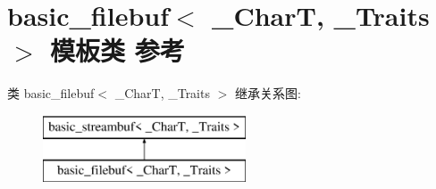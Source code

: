 \hypertarget{classbasic__filebuf}{}\section{basic\+\_\+filebuf$<$ \+\_\+\+CharT, \+\_\+\+Traits $>$ 模板类 参考}
\label{classbasic__filebuf}
类 basic\+\_\+filebuf$<$ \+\_\+\+CharT, \+\_\+\+Traits $>$ 继承关系图\+:\begin{figure}[H]
\begin{center}
\leavevmode
\includegraphics[height=2.000000cm]{classbasic__filebuf}
\end{center}
\end{figure}
